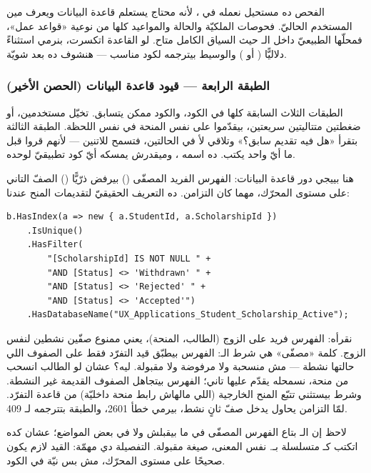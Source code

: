 الفحص ده مستحيل نعمله في ، لأنه محتاج يستعلم قاعدة البيانات ويعرف مين المستخدم الحاليّ. فحوصات الملكيّة والحالة والمواعيد كلها من نوعية «قواعد عمل»، فمحلّها الطبيعيّ داخل الـ حيث السياق الكامل متاح. لو القاعدة اتكسرت، بنرمي استثناءً دلاليًّا ( أو ) والوسيط بيترجمه لكود  مناسب — هنشوف ده بعد شويّة.

\subsubsection{الطبقة الرابعة — قيود قاعدة البيانات (الحصن الأخير)}

الطبقات الثلاث السابقة كلها في الكود، والكود ممكن يتسابق. تخيّل مستخدمين، أو ضغطتين متتاليتين سريعتين، بيقدّموا على نفس المنحة في نفس اللحظة. الطبقة الثالثة بتقرأ «هل فيه تقديم سابق؟» وتلاقي لأ في الحالتين، فتسمح للاتنين — لأنهم قروا قبل ما أيّ واحد يكتب. ده اسمه ، وميقدرش يمسكه أيّ كود تطبيقيّ لوحده.

هنا بييجي دور قاعدة البيانات: الفهرس الفريد المصفّى () بيرفض ذرّيًّا () الصفّ التاني على مستوى المحرّك، مهما كان التزامن. ده التعريف الحقيقيّ لتقديمات المنح عندنا:

\begin{english}
\begin{lstlisting}[language={[Sharp]C}]
b.HasIndex(a => new { a.StudentId, a.ScholarshipId })
    .IsUnique()
    .HasFilter(
        "[ScholarshipId] IS NOT NULL " +
        "AND [Status] <> 'Withdrawn' " +
        "AND [Status] <> 'Rejected' " +
        "AND [Status] <> 'Accepted'")
    .HasDatabaseName("UX_Applications_Student_Scholarship_Active");
\end{lstlisting}
\end{english}

نقرأه: الفهرس فريد على الزوج (الطالب، المنحة)، يعني ممنوع صفّين نشطين لنفس الزوج. كلمة «مصفّى» هي شرط الـ: الفهرس بيطبّق قيد التفرّد فقط على الصفوف اللي حالتها نشطة — مش منسحبة ولا مرفوضة ولا مقبولة. ليه؟ عشان لو الطالب انسحب من منحة، نسمحله يقدّم عليها تاني؛ الفهرس بيتجاهل الصفوف القديمة غير النشطة. وشرط  بيستثني تتبّع المنح الخارجية (اللي مالهاش رابط منحة داخليّة) من قاعدة التفرّد. لمّا التزامن يحاول يدخل صفّ ثانٍ نشط،  بيرمي خطأ 2601، والطبقة بتترجمه لـ 409.

\begin{secnote}
لاحظ إن الـ بتاع الفهرس المصفّى في  ما بيقبلش  ولا  في بعض المواضع؛ عشان كده اتكتب كـ\code{<>} متسلسلة بـ. نفس المعنى، صيغة مقبولة. التفصيلة دي مهمّة: القيد لازم يكون صحيحًا على مستوى المحرّك، مش بس نيّة في الكود.
\end{secnote}

